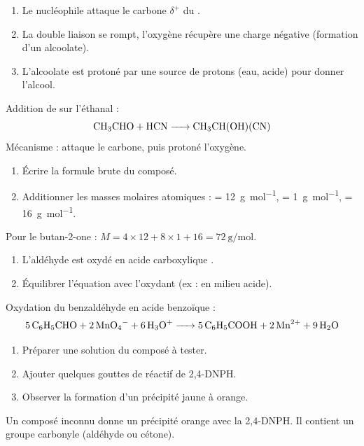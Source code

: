 \begin{enumerate}
    \item Le nucléophile  attaque le carbone $\delta^+$ du .
    \item La double liaison  se rompt, l'oxygène récupère une charge négative (formation d'un alcoolate).
    \item L'alcoolate est protoné par une source de protons (eau, acide) pour donner l'alcool.
\end{enumerate}
\begin{exemple}
Addition de  sur l'éthanal :
\[
\ce{CH3CHO + HCN -> CH3CH(OH)(CN)}
\]
Mécanisme :  attaque le carbone, puis  protoné l'oxygène.
\end{exemple}

\begin{enumerate}
    \item Écrire la formule brute du composé.
    \item Additionner les masses molaires atomiques :  = \SI{12}{\gram\per\mol},  = \SI{1}{\gram\per\mol},  = \SI{16}{\gram\per\mol}.
\end{enumerate}
\begin{exemple}
Pour le butan-2-one  : $M = 4 \times 12 + 8 \times 1 + 16 = \SI{72}{\gram\per\mol}$.
\end{exemple}

\begin{enumerate}
    \item L'aldéhyde  est oxydé en acide carboxylique .
    \item Équilibrer l'équation avec l'oxydant (ex :  en milieu acide).
\end{enumerate}
\begin{exemple}
Oxydation du benzaldéhyde  en acide benzoïque  :
\[
\ce{5 C6H5CHO + 2 MnO4- + 6 H3O+ -> 5 C6H5COOH + 2 Mn^2+ + 9 H2O}
\]
\end{exemple}

\begin{enumerate}
    \item Préparer une solution du composé à tester.
    \item Ajouter quelques gouttes de réactif de 2,4-DNPH.
    \item Observer la formation d'un précipité jaune à orange.
\end{enumerate}
\begin{exemple}
Un composé inconnu donne un précipité orange avec la 2,4-DNPH. Il contient un groupe carbonyle (aldéhyde ou cétone).
\end{exemple}

